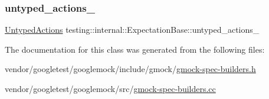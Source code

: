 \subsubsection{\texorpdfstring{untyped\+\_\+actions\+\_\+}{untyped\_actions\_}}
{\footnotesize\ttfamily \hyperlink{classtesting_1_1internal_1_1_expectation_base_a9b21e82059961b9f1198d3f5d518254f}{Untyped\+Actions} testing\+::internal\+::\+Expectation\+Base\+::untyped\+\_\+actions\+\_\+\hspace{0.3cm}{\ttfamily [protected]}}



The documentation for this class was generated from the following files\+:\begin{DoxyCompactItemize}
\item 
vendor/googletest/googlemock/include/gmock/\hyperlink{gmock-spec-builders_8h}{gmock-\/spec-\/builders.\+h}\item 
vendor/googletest/googlemock/src/\hyperlink{gmock-spec-builders_8cc}{gmock-\/spec-\/builders.\+cc}\end{DoxyCompactItemize}
